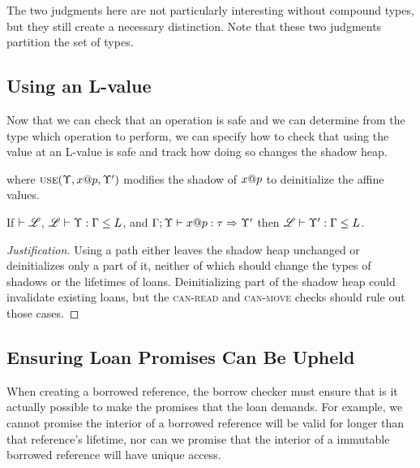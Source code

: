 The two judgments here are not particularly interesting without compound types,
but they still create a necessary distinction.
Note that these two judgments partition the set of types.

\subsection*{Using an L-value}
Now that we can check that an operation is safe and we can determine from the type
which operation to perform, we can specify how to check that using the value at an L-value 
is safe and track how doing so changes the shadow heap.
\newline



where $\textsc{use}(\Upsilon,{x}@{p},\Upsilon')$ modifies the shadow 
of ${x}@{p}$ to deinitialize the affine values.

\begin{conj}
  If $\vdash\mathscr{L}$, ${\mathscr{L}} \vdash {\Upsilon} : {\Gamma} \leq {L}$, and ${\Gamma};{\Upsilon}\vdash{{x}@{p}}:{\tau}\Rightarrow{\Upsilon'}$
  then ${\mathscr{L}} \vdash {\Upsilon'} : {\Gamma} \leq {L}$.
\end{conj}

\begin{proof}[Justification]
  Using a path either leaves the shadow heap unchanged or deinitializes only a part of it,
  neither of which should change the types of shadows or the lifetimes of loans.
  Deinitializing part of the shadow heap could invalidate existing loans,
  but the \textsc{can-read} and \textsc{can-move} checks should rule out those cases.
\end{proof}

\subsection*{Ensuring Loan Promises Can Be Upheld}
When creating a borrowed reference, the borrow checker must ensure
that is it actually possible to make the promises that the loan demands.
For example, we cannot promise the interior of a borrowed reference will be 
valid for longer than that reference's lifetime, nor can we promise that
the interior of a immutable borrowed reference will have unique access.

